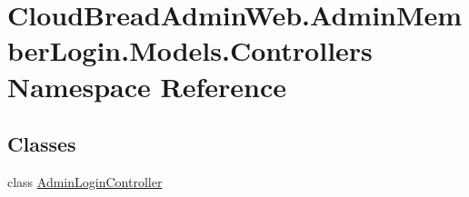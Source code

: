 \hypertarget{a00417}{}\section{Cloud\+Bread\+Admin\+Web.\+Admin\+Member\+Login.\+Models.\+Controllers Namespace Reference}
\label{a00417}
\subsection*{Classes}
\begin{DoxyCompactItemize}
\item 
class \hyperlink{a00009}{Admin\+Login\+Controller}
\end{DoxyCompactItemize}

